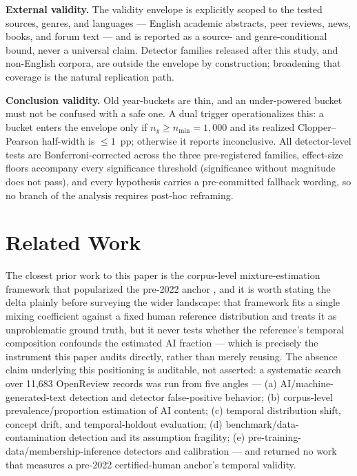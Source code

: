 \documentclass[conference]{IEEEtran}
\begin{document}
\textbf{External validity.} The validity envelope is explicitly scoped to the tested sources, genres, and languages --- English academic abstracts, peer reviews, news, books, and forum text --- and is reported as a source- and genre-conditional bound, never a universal claim. Detector families released after this study, and non-English corpora, are outside the envelope by construction; broadening that coverage is the natural replication path.

\textbf{Conclusion validity.} Old year-buckets are thin, and an under-powered bucket must not be confused with a safe one. A dual trigger operationalizes this: a bucket enters the envelope only if $n_y \geq n_{\min} = 1{,}000$ and its realized Clopper--Pearson half-width is $\leq 1$~pp; otherwise it reports inconclusive. All detector-level tests are Bonferroni-corrected across the three pre-registered families, effect-size floors accompany every significance threshold (significance without magnitude does not pass), and every hypothesis carries a pre-committed fallback wording, so no branch of the analysis requires post-hoc reframing.

\section{Related Work}\label{sec:related}

The closest prior work to this paper is the corpus-level mixture-estimation framework that popularized the pre-2022 anchor \cite{MonitorAIScale}, and it is worth stating the delta plainly before surveying the wider landscape: that framework fits a single mixing coefficient against a fixed human reference distribution and treats it as unproblematic ground truth, but it never tests whether the reference's temporal composition confounds the estimated AI fraction --- which is precisely the instrument this paper audits directly, rather than merely reusing. The absence claim underlying this positioning is auditable, not asserted: a systematic search over 11,683 OpenReview records was run from five angles --- (a) AI/machine-generated-text detection and detector false-positive behavior; (b) corpus-level prevalence/proportion estimation of AI content; (c) temporal distribution shift, concept drift, and temporal-holdout evaluation; (d) benchmark/data-contamination detection and its assumption fragility; (e) pre-training-data/membership-inference detectors and calibration --- and returned no work that measures a pre-2022 certified-human anchor's temporal validity.
\end{document}

